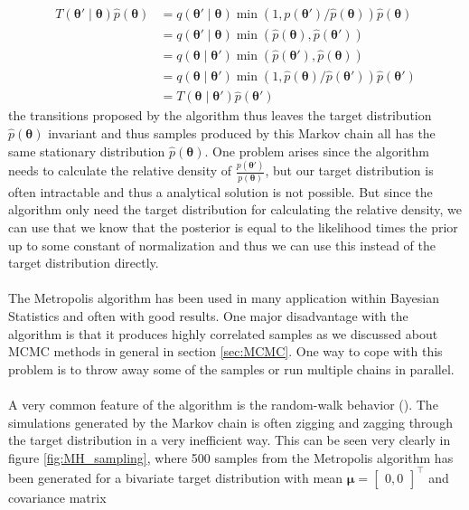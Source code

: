 \begin{equation*}
\begin{aligned}
T\left(\boldsymbol{\theta}' \mid \boldsymbol{\theta}\right) \hat{p}(\boldsymbol{\theta}) &=q\left(\boldsymbol{\theta}' \mid \boldsymbol{\theta}\right) \min \left(1, p\left(\boldsymbol{\theta}'\right) / \hat{p}(\boldsymbol{\theta})\right) \hat{p}(\boldsymbol{\theta}) \\
&=q\left(\boldsymbol{\theta}' \mid \boldsymbol{\theta}\right) \min \left(\hat{p}(\boldsymbol{\theta}), \hat{p}\left(\boldsymbol{\theta}'\right)\right) \\
&=q\left(\boldsymbol{\theta} \mid \boldsymbol{\theta}'\right) \min \left(\hat{p}\left(\boldsymbol{\theta}'\right), \hat{p}(\boldsymbol{\theta})\right) \\
&=q\left(\boldsymbol{\theta} \mid \boldsymbol{\theta}'\right) \min \left(1, \hat{p}(\boldsymbol{\theta}) / \hat{p}\left(\boldsymbol{\theta}'\right)\right) \hat{p}\left(\boldsymbol{\theta}'\right) \\
&=T\left(\boldsymbol{\theta} \mid \boldsymbol{\theta}'\right) \hat{p}\left(\boldsymbol{\theta}'\right)
\end{aligned}
\end{equation*}
the transitions proposed by the algorithm thus leaves the target distribution $\hat{p}(\boldsymbol{\theta})$ invariant and thus samples produced by this Markov chain all has the same stationary distribution $\hat{p}(\boldsymbol{\theta})$. One problem arises since the algorithm needs to calculate the relative density of $\frac{p(\boldsymbol{\theta'})}{p\left(\boldsymbol{\theta}\right)}$, but our target distribution is often intractable and thus a analytical solution is not possible. But since the algorithm only need the target distribution for calculating the relative density, we can use that we know that the posterior is equal to the likelihood times the prior up to some constant of normalization and thus we can use this instead of the target distribution directly.\\
\\
The Metropolis algorithm has been used in many application within Bayesian Statistics and often with good results. One major disadvantage with the algorithm is that it produces highly correlated samples as we discussed about MCMC methods in general in section \ref{sec:MCMC}. One way to cope with this problem is to throw away some of the samples or run multiple chains in parallel.\\
\\
A very common feature of the algorithm is the random-walk behavior (\cite{gelmanbda04}). The simulations generated by the Markov chain is often zigging and zagging through the target distribution in a very inefficient way. This can be seen very clearly in figure \ref{fig:MH_sampling}, where 500 samples from the Metropolis algorithm has been generated for a bivariate target distribution with mean $\boldsymbol{\mu}=\left[\begin{array}{l}
0, 
0
\end{array}\right]^\top$ and covariance matrix
